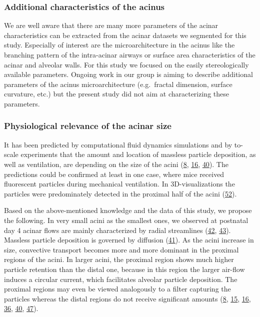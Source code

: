 \documentclass[
  american,
]{article}
\begin{document}
\hypertarget{additional-characteristics-of-the-acinus}{%
\subsubsection{Additional characteristics of the acinus}\label{additional-characteristics-of-the-acinus}}

We are well aware that there are many more parameters of the acinar characteristics can be extracted from the acinar datasets we segmented for this study.
Especially of interest are the microarchitecture in the acinus like the branching pattern of the intra-acinar airways or surface area characteristics of the acinar and alveolar walls.
For this study we focused on the easily stereologically available parameters.
Ongoing work in our group is aiming to describe additional parameters of the acinus microarchitecture (e.g.~fractal dimension, surface curvature, etc.) but the present study did not aim at characterizing these parameters.

\hypertarget{physiological-relevance-of-the-acinar-size}{%
\subsubsection{Physiological relevance of the acinar size}\label{physiological-relevance-of-the-acinar-size}}

It has been predicted by computational fluid dynamics simulations and by to-scale experiments that the amount and location of massless particle deposition, as well as ventilation, are depending on the size of the acini (\protect\hyperlink{ref-CVl41LwO}{8}, \protect\hyperlink{ref-1DP2FRUSZ}{16}, \protect\hyperlink{ref-RJ9GQcwl}{40}).
The predictions could be confirmed at least in one case, where mice received fluorescent particles during mechanical ventilation.
In 3D-visualizations the particles were predominately detected in the proximal half of the acini (\protect\hyperlink{ref-19jBv0ima}{52}).

Based on the above-mentioned knowledge and the data of this study, we propose the following.
In very small acini as the smallest ones, we observed at postnatal day 4 acinar flows are mainly characterized by radial streamlines (\protect\hyperlink{ref-afF83siN}{42}, \protect\hyperlink{ref-eioib1TQ}{43}).
Massless particle deposition is governed by diffusion (\protect\hyperlink{ref-k5fqLjiy}{41}).
As the acini increase in size, convective transport becomes more and more dominant in the proximal regions of the acini.
In larger acini, the proximal region shows much higher particle retention than the distal one, because in this region the larger air-flow induces a circular current, which facilitates alveolar particle deposition.
The proximal regions may even be viewed analogously to a filter capturing the particles whereas the distal regions do not receive significant amounts (\protect\hyperlink{ref-CVl41LwO}{8}, \protect\hyperlink{ref-1HOyVjqpM}{15}, \protect\hyperlink{ref-1DP2FRUSZ}{16}, \protect\hyperlink{ref-yHHhvOtP}{36}, \protect\hyperlink{ref-RJ9GQcwl}{40}, \protect\hyperlink{ref-OT4s1CSX}{47}).
\end{document}
